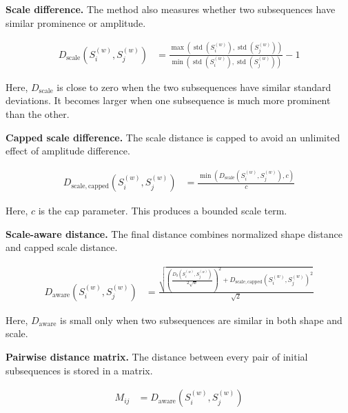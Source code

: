 \documentclass{book}
\begin{document}
      \noindent
      \textbf{Scale difference.}
      The method also measures whether two subsequences have similar prominence or amplitude.

      \begin{align}
         D_{\mathrm{scale}}(S_i^{(w)},S_j^{(w)})
         &=
         \frac{
         \max\left(\operatorname{std}(S_i^{(w)}),\operatorname{std}(S_j^{(w)})\right)
         }{
         \min\left(\operatorname{std}(S_i^{(w)}),\operatorname{std}(S_j^{(w)})\right)
         }
         -1
      \end{align}

      \noindent
      Here, \(D_{\mathrm{scale}}\) is close to zero when the two subsequences have similar standard deviations. It becomes larger when one subsequence is much more prominent than the other.

      \noindent
      \textbf{Capped scale difference.}
      The scale distance is capped to avoid an unlimited effect of amplitude difference.

      \begin{align}
         D_{\mathrm{scale,capped}}(S_i^{(w)},S_j^{(w)})
         &=
         \frac{
         \min\left(D_{\mathrm{scale}}(S_i^{(w)},S_j^{(w)}),c\right)
         }{c}
      \end{align}

      \noindent
      Here, \(c\) is the cap parameter. This produces a bounded scale term.

      \noindent
      \textbf{Scale-aware distance.}
      The final distance combines normalized shape distance and capped scale distance.

      \begin{align}
         D_{\mathrm{aware}}(S_i^{(w)},S_j^{(w)})
         &=
         \frac{
         \sqrt{
         \left(
         \frac{D_{\mathrm{z}}(S_i^{(w)},S_j^{(w)})}{2\sqrt{w}}
         \right)^2
         +
         D_{\mathrm{scale,capped}}(S_i^{(w)},S_j^{(w)})^2
         }
         }{\sqrt{2}}
      \end{align}

      \noindent
      Here, \(D_{\mathrm{aware}}\) is small only when two subsequences are similar in both shape and scale.

      \noindent
      \textbf{Pairwise distance matrix.}
      The distance between every pair of initial subsequences is stored in a matrix.

      \begin{align}
         M_{ij}
         &=
         D_{\mathrm{aware}}(S_i^{(w)},S_j^{(w)})
      \end{align}
\end{document}
